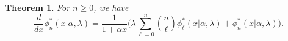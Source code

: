 \documentclass{amsart}
\newtheorem{theorem}{Theorem}[section]
\numberwithin{equation}{section}
\theoremstyle{definition}
\theoremstyle{remark}
\begin{document}
\begin{theorem}
For $n\geq 0$, we have  
    $$\frac{d}{dx}\phi^{*}_{n}(x|\alpha,\lambda)=\frac{1}{1+\alpha x}\Bigg(\lambda \sum_{\ell=0}^{n}\binom{n}{\ell}\phi^{*}_{\ell}(x|\alpha,\lambda)+\phi^{*}_{n}(x|\alpha,\lambda)\Bigg).$$
\end{theorem}
\end{document}
